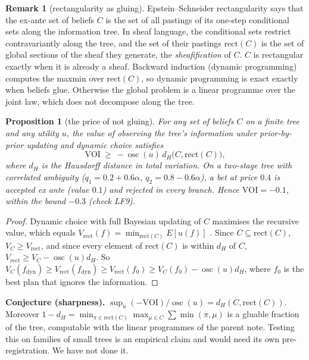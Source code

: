\documentclass[11pt]{article}
\newtheorem{proposition}{Proposition}\newtheorem{corollary}{Corollary}\newtheorem{lemma}{Lemma}
\theoremstyle{definition}\newtheorem{definition}{Definition}\newtheorem{remark}{Remark}
\begin{document}
\begin{remark}[rectangularity as gluing]
Epstein--Schneider rectangularity \cite{EpsteinSchneider2003} says that the ex-ante set of beliefs $C$ is the set of all pastings of
its one-step conditional sets along the information tree. In sheaf language, the conditional sets restrict contravariantly along the
tree, and the set of their pastings $\mathrm{rect}(C)$ is the set of global sections of the sheaf they generate, the
\emph{sheafification} of $C$. $C$ is rectangular exactly when it is already a sheaf. Backward induction (dynamic programming) computes
the maxmin over $\mathrm{rect}(C)$, so dynamic programming is exact exactly when beliefs glue. Otherwise the global problem is a
linear programme over the joint law, which does not decompose along the tree.
\end{remark}

\begin{proposition}[the price of not gluing]\label{prop:rect}
For any set of beliefs $C$ on a finite tree and any utility $u$, the value of observing the tree's information under prior-by-prior
updating and dynamic choice satisfies
\[
\mathrm{VOI}\ \ge\ -\operatorname{osc}(u)\,d_H\bigl(C,\mathrm{rect}(C)\bigr),
\]
where $d_H$ is the Hausdorff distance in total variation. On a two-stage tree with correlated ambiguity
($q_1=0.2+0.6\alpha$, $q_2=0.8-0.6\alpha$), a bet at price $0.4$ is accepted ex ante (value $0.1$) and rejected in every branch. Hence
$\mathrm{VOI}=-0.1$, within the bound $-0.3$ (check LF9).
\end{proposition}

\begin{proof}
Dynamic choice with full Bayesian updating of $C$ maximises the recursive value, which equals $V_{\mathrm{rect}}(f)=\min_{\mathrm{rect}(C)}E[u(f)]$
\cite{EpsteinSchneider2003}. Since $C\subseteq\mathrm{rect}(C)$, $V_C\ge V_{\mathrm{rect}}$, and since every element of $\mathrm{rect}(C)$
is within $d_H$ of $C$, $V_{\mathrm{rect}}\ge V_C-\operatorname{osc}(u)d_H$. So $V_C(f_{\mathrm{dyn}})\ge V_{\mathrm{rect}}(f_{\mathrm{dyn}})\ge V_{\mathrm{rect}}(f_0)\ge V_C(f_0)-\operatorname{osc}(u)d_H$,
where $f_0$ is the best plan that ignores the information.
\end{proof}

\noindent\textbf{Conjecture (sharpness).} $\sup_u(-\mathrm{VOI})/\operatorname{osc}(u)=d_H(C,\mathrm{rect}(C))$. Moreover
$1-d_H=\min_{\pi\in\mathrm{rect}(C)}\max_{\mu\in C}\sum\min(\pi,\mu)$ is a gluable fraction of the tree, computable with the
linear programmes of the parent note. Testing this on families of small trees is an empirical claim and would need its own
pre-registration. We have not done it.
\end{document}
